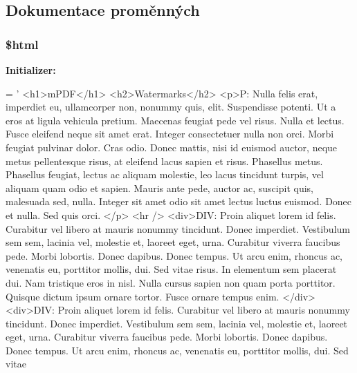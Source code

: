 \subsection{Dokumentace proměnných}
\hypertarget{example35__watermarks_8php_a6f96e7fc92441776c9d1cd3386663b40}{
\subsubsection[{\$html}]{\setlength{\rightskip}{0pt plus 5cm}\$html}}\label{example35__watermarks_8php_a6f96e7fc92441776c9d1cd3386663b40}
{\bfseries Initializer\-:}
\begin{DoxyCode}
= \textcolor{stringliteral}{'}
\textcolor{stringliteral}{<h1>mPDF</h1>}
\textcolor{stringliteral}{<h2>Watermarks</h2>}
\textcolor{stringliteral}{<p>P: Nulla felis erat, imperdiet eu, ullamcorper non, nonummy quis, elit. Suspendisse potenti. Ut a eros
       at ligula vehicula pretium. Maecenas feugiat pede vel risus. Nulla et lectus. Fusce eleifend neque sit amet
       erat. Integer consectetuer nulla non orci. Morbi feugiat pulvinar dolor. Cras odio. Donec mattis, nisi id
       euismod auctor, neque metus pellentesque risus, at eleifend lacus sapien et risus. Phasellus metus. Phasellus
       feugiat, lectus ac aliquam molestie, leo lacus tincidunt turpis, vel aliquam quam odio et sapien. Mauris ante
       pede, auctor ac, suscipit quis, malesuada sed, nulla. Integer sit amet odio sit amet lectus luctus euismod.
       Donec et nulla. Sed quis orci. </p>}
\textcolor{stringliteral}{}
\textcolor{stringliteral}{<hr />}
\textcolor{stringliteral}{}
\textcolor{stringliteral}{<div>DIV: Proin aliquet lorem id felis. Curabitur vel libero at mauris nonummy tincidunt. Donec imperdiet.
       Vestibulum sem sem, lacinia vel, molestie et, laoreet eget, urna. Curabitur viverra faucibus pede. Morbi
       lobortis. Donec dapibus. Donec tempus. Ut arcu enim, rhoncus ac, venenatis eu, porttitor mollis, dui. Sed vitae
       risus. In elementum sem placerat dui. Nam tristique eros in nisl. Nulla cursus sapien non quam porta
       porttitor. Quisque dictum ipsum ornare tortor. Fusce ornare tempus enim. </div>}
\textcolor{stringliteral}{<div>DIV: Proin aliquet lorem id felis. Curabitur vel libero at mauris nonummy tincidunt. Donec imperdiet.
       Vestibulum sem sem, lacinia vel, molestie et, laoreet eget, urna. Curabitur viverra faucibus pede. Morbi
       lobortis. Donec dapibus. Donec tempus. Ut arcu enim, rhoncus ac, venenatis eu, porttitor mollis, dui. Sed vitae
}
\end{DoxyCode}
